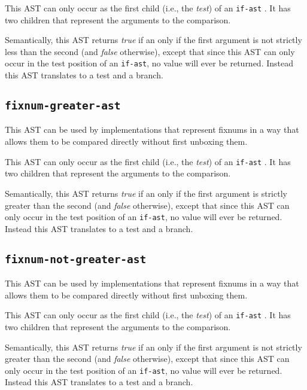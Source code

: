This AST can only occur as the first child (i.e., the \emph{test}) of
an \texttt{if-ast} .  It has two children that
represent the arguments to the comparison.  

Semantically, this AST returns \emph{true} if an only if the first
argument is not strictly less than the second (and \emph{false}
otherwise), except that since this AST can only occur in the test
position of an \texttt{if-ast}, no value will ever be returned.
Instead this AST translates to a test and a branch. 

\subsection{\texttt{fixnum-greater-ast}}
\label{fixnum-greater-ast}

This AST can be used by implementations that represent fixnums in a
way that allows them to be compared directly without first unboxing
them.

This AST can only occur as the first child (i.e., the \emph{test}) of
an \texttt{if-ast} .  It has two children that
represent the arguments to the comparison.  

Semantically, this AST returns \emph{true} if an only if the first
argument is strictly greater than the second (and \emph{false}
otherwise), except that since this AST can only occur in the test
position of an \texttt{if-ast}, no value will ever be returned.
Instead this AST translates to a test and a branch. 

\subsection{\texttt{fixnum-not-greater-ast}}
\label{fixnum-not-greater-ast}

This AST can be used by implementations that represent fixnums in a
way that allows them to be compared directly without first unboxing
them.

This AST can only occur as the first child (i.e., the \emph{test}) of
an \texttt{if-ast} .  It has two children that
represent the arguments to the comparison.  

Semantically, this AST returns \emph{true} if an only if the first
argument is not strictly greater than the second (and \emph{false}
otherwise), except that since this AST can only occur in the test
position of an \texttt{if-ast}, no value will ever be returned.
Instead this AST translates to a test and a branch. 

